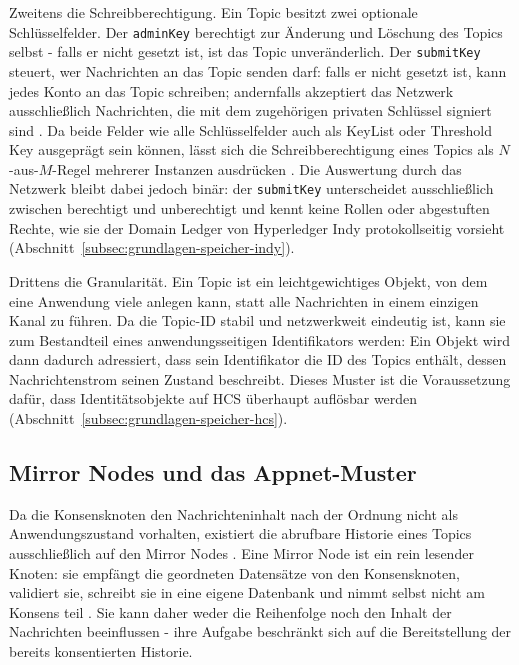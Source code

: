 Zweitens die Schreibberechtigung. Ein Topic besitzt zwei optionale Schlüsselfelder. Der \texttt{adminKey} berechtigt zur Änderung und Löschung des Topics selbst - falls er nicht gesetzt ist, ist das Topic unveränderlich. Der \texttt{submitKey} steuert, wer Nachrichten an das Topic senden darf: falls er nicht gesetzt ist, kann jedes Konto an das Topic schreiben; andernfalls akzeptiert das Netzwerk ausschließlich Nachrichten, die mit dem zugehörigen privaten Schlüssel signiert sind \cite{hederacreatetopic}. Da beide Felder wie alle Schlüsselfelder auch als KeyList oder Threshold Key ausgeprägt sein können, lässt sich die Schreibberechtigung eines Topics als $N$-aus-$M$-Regel mehrerer Instanzen ausdrücken \cite{hederakeys}. Die Auswertung durch das Netzwerk bleibt dabei jedoch binär: der \texttt{submitKey} unterscheidet ausschließlich zwischen berechtigt und unberechtigt und kennt keine Rollen oder abgestuften Rechte, wie sie der Domain Ledger von Hyperledger Indy protokollseitig vorsieht (Abschnitt~\ref{subsec:grundlagen-speicher-indy}).

Drittens die Granularität. Ein Topic ist ein leichtgewichtiges Objekt, von dem eine Anwendung viele anlegen kann, statt alle Nachrichten in einem einzigen Kanal zu führen. Da die Topic-ID stabil und netzwerkweit eindeutig ist, kann sie zum Bestandteil eines anwendungsseitigen Identifikators werden: Ein Objekt wird dann dadurch adressiert, dass sein Identifikator die ID des Topics enthält, dessen Nachrichtenstrom seinen Zustand beschreibt. Dieses Muster ist die Voraussetzung dafür, dass Identitätsobjekte auf HCS überhaupt auflösbar werden (Abschnitt~\ref{subsec:grundlagen-speicher-hcs}).

\subsection{Mirror Nodes und das Appnet-Muster}
\label{subsec:grundlagen-mirrornodes}
Da die Konsensknoten den Nachrichteninhalt nach der Ordnung nicht als Anwendungszustand vorhalten, existiert die abrufbare Historie eines Topics ausschließlich auf den Mirror Nodes \cite{bairdgross2019}. Eine Mirror Node ist ein rein lesender Knoten: sie empfängt die geordneten Datensätze von den Konsensknoten, validiert sie, schreibt sie in eine eigene Datenbank und nimmt selbst nicht am Konsens teil \cite{hederamirrornodes, hederamainnetnodes}. Sie kann daher weder die Reihenfolge noch den Inhalt der Nachrichten beeinflussen - ihre Aufgabe beschränkt sich auf die Bereitstellung der bereits konsentierten Historie.

